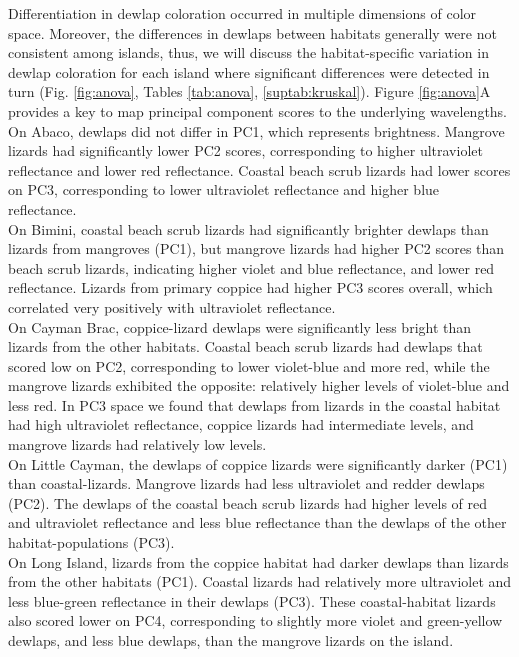 Differentiation in dewlap coloration occurred in multiple dimensions of color space. Moreover, the differences in dewlaps between habitats generally were not consistent among islands, thus, we will discuss the habitat-specific variation in dewlap coloration for each island where significant differences were detected in turn (Fig. \ref{fig:anova}, Tables \ref{tab:anova}, \ref{suptab:kruskal}). Figure \ref{fig:anova}A provides a key to map principal component scores to the underlying wavelengths.\\

On Abaco, dewlaps did not differ in PC1, which represents brightness. Mangrove lizards had significantly lower PC2 scores, corresponding to higher ultraviolet reflectance and lower red reflectance. Coastal beach scrub lizards had lower scores on PC3, corresponding to lower ultraviolet reflectance and higher blue reflectance.\\

On Bimini, coastal beach scrub lizards had significantly brighter dewlaps than lizards from mangroves (PC1), but mangrove lizards had higher PC2 scores than beach scrub lizards, indicating higher violet and blue reflectance, and lower red reflectance. Lizards from primary coppice had higher PC3 scores overall, which correlated very positively with ultraviolet reflectance.\\

On Cayman Brac, coppice-lizard dewlaps were significantly less bright than lizards from the other habitats. Coastal beach scrub lizards had dewlaps that scored low on PC2, corresponding to lower violet-blue and more red, while the mangrove lizards exhibited the opposite: relatively higher levels of violet-blue and less red. In PC3 space we found that dewlaps from lizards in the coastal habitat had high ultraviolet reflectance, coppice lizards had intermediate levels, and mangrove lizards had relatively low levels.\\

On Little Cayman, the dewlaps of coppice lizards were significantly darker (PC1) than coastal-lizards. Mangrove lizards had less ultraviolet and redder dewlaps (PC2). The dewlaps of the coastal beach scrub lizards had higher levels of red and ultraviolet reflectance and less blue reflectance than the dewlaps of the other habitat-populations (PC3).\\

On Long Island, lizards from the coppice habitat had darker dewlaps than lizards from the other habitats (PC1). Coastal lizards had relatively more ultraviolet and less blue-green reflectance in their dewlaps (PC3). These coastal-habitat lizards also scored lower on PC4, corresponding to slightly more violet and green-yellow dewlaps, and less blue dewlaps, than the mangrove lizards on the island.\\

